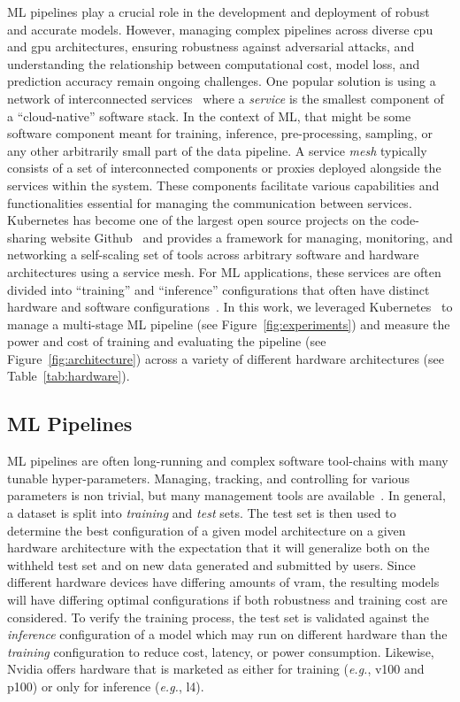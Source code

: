 \documentclass[sn-mathphys-num]{sn-jnl}%
\begin{document}
ML pipelines play a crucial role in the development and deployment of robust and accurate models. However, managing complex pipelines across diverse \acrfull{cpu} and \acrfull{gpu}  architectures, ensuring robustness against adversarial attacks, and understanding the relationship between computational cost, model loss, and prediction accuracy remain ongoing challenges.
One popular solution is using a network of interconnected services~\cite{panchal2024reusable,hasselbring2017microservice,zhou2022online,singh2023load} where a \textit{service} is the smallest component of a ``cloud-native'' software stack. In the context of ML, that might be some software component meant for training, inference, pre-processing, sampling, or any other arbitrarily small part of the data pipeline.
A service \textit{mesh} typically consists of a set of interconnected components or proxies deployed alongside the services within the system. These components facilitate various capabilities and functionalities essential for managing the communication between services. Kubernetes has become one of the largest open source projects on the code-sharing website Github~\cite{k8s-size} and provides a framework for managing, monitoring, and networking a self-scaling set of tools across arbitrary software and hardware architectures using a service mesh. For ML applications, these services are often divided into ``training'' and ``inference'' configurations that often have distinct hardware and software configurations~\cite{wang2019benchmarking}. In this work, we leveraged Kubernetes~\cite{k8s} to manage a multi-stage ML pipeline (see Figure~\ref{fig:experiments}) and measure the power and cost of training and evaluating the pipeline (see Figure~\ref{fig:architecture}) across a variety of different hardware architectures (see Table~\ref{tab:hardware}).


\subsection{ML Pipelines}
\label{ml_pipelines}
ML pipelines are often long-running and complex software tool-chains with many tunable hyper-parameters.
Managing, tracking, and controlling for various parameters is non trivial, but many management tools are available~\cite{dvc,hydra,k8s}.
In general, a dataset is split into \textit{training} and \textit{test} sets.
The test set is then used to determine the best configuration of a given model architecture on a given hardware architecture with the expectation that it will generalize both on the withheld test set and on new data generated and submitted by users.
Since different hardware devices have differing amounts of \acrfull{vram}, the resulting models will have differing optimal configurations if both robustness and training cost are considered.
To verify the training process, the test set is validated against the \textit{inference} configuration of a model which may run on different hardware than the \textit{training} configuration to reduce cost, latency, or power consumption. Likewise, Nvidia offers hardware that is marketed as either for training (\textit{e.g.}, v100 and p100) or only for inference (\textit{e.g.}, l4).
\end{document}
